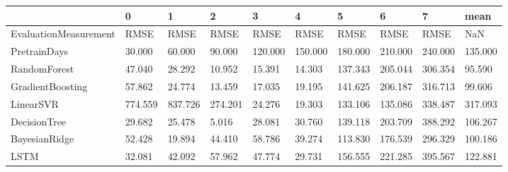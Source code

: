 \begin{tabular}{llllllllll}
\toprule
{} &       0 &       1 &       2 &       3 &       4 &       5 &       6 &       7 &    mean \\
\midrule
EvaluationMeasurement &    RMSE &    RMSE &    RMSE &    RMSE &    RMSE &    RMSE &    RMSE &    RMSE &     NaN \\
PretrainDays          &  30.000 &  60.000 &  90.000 & 120.000 & 150.000 & 180.000 & 210.000 & 240.000 & 135.000 \\
RandomForest          &  47.040 &  28.292 &  10.952 &  15.391 &  14.303 & 137.343 & 205.044 & 306.354 &  95.590 \\
GradientBoosting      &  57.862 &  24.774 &  13.459 &  17.035 &  19.195 & 141.625 & 206.187 & 316.713 &  99.606 \\
LinearSVR             & 774.559 & 837.726 & 274.201 &  24.276 &  19.303 & 133.106 & 135.086 & 338.487 & 317.093 \\
DecisionTree          &  29.682 &  25.478 &   5.016 &  28.081 &  30.760 & 139.118 & 203.709 & 388.292 & 106.267 \\
BayesianRidge         &  52.428 &  19.894 &  44.410 &  58.786 &  39.274 & 113.830 & 176.539 & 296.329 & 100.186 \\
LSTM                  &  32.081 &  42.092 &  57.962 &  47.774 &  29.731 & 156.555 & 221.285 & 395.567 & 122.881 \\
\bottomrule
\end{tabular}
